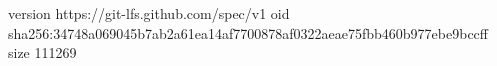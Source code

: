 version https://git-lfs.github.com/spec/v1
oid sha256:34748a069045b7ab2a61ea14af7700878af0322aeae75fbb460b977ebe9bccff
size 111269
